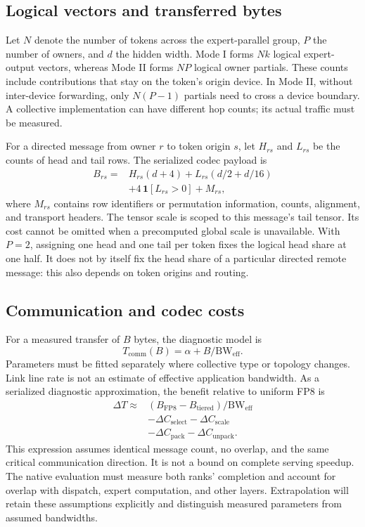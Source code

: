 \subsection{Logical vectors and transferred bytes}
Let $N$ denote the number of tokens across the expert-parallel group, $P$ the number of owners, and $d$ the hidden width. Mode I forms $Nk$ logical expert-output vectors, whereas Mode II forms $NP$ logical owner partials. These counts include contributions that stay on the token's origin device. In Mode II, without inter-device forwarding, only $N(P-1)$ partials need to cross a device boundary. A collective implementation can have different hop counts; its actual traffic must be measured.

For a directed message from owner $r$ to token origin $s$, let $H_{rs}$ and $L_{rs}$ be the counts of head and tail rows. The serialized codec payload is
\begin{align}
 B_{rs} ={}& H_{rs}(d+4) + L_{rs}(d/2+d/16) \\
 &+4\,\mathbf{1}[L_{rs}>0]+M_{rs},
\end{align}
where $M_{rs}$ contains row identifiers or permutation information, counts, alignment, and transport headers. The tensor scale is scoped to this message's tail tensor. Its cost cannot be omitted when a precomputed global scale is unavailable. With $P=2$, assigning one head and one tail per token fixes the logical head share at one half. It does not by itself fix the head share of a particular directed remote message: this also depends on token origins and routing.

\subsection{Communication and codec costs}
For a measured transfer of $B$ bytes, the diagnostic model is
\[
 T_{\mathrm{comm}}(B)=\alpha+B/\mathrm{BW}_{\mathrm{eff}}.
\]
Parameters must be fitted separately where collective type or topology changes. Link line rate is not an estimate of effective application bandwidth. As a serialized diagnostic approximation, the benefit relative to uniform FP8 is
\begin{align}
\Delta T \approx{}& (B_{\mathrm{FP8}}-B_{\mathrm{tiered}})/\mathrm{BW}_{\mathrm{eff}} \\
&-\Delta C_{\mathrm{select}}-\Delta C_{\mathrm{scale}} \\
&-\Delta C_{\mathrm{pack}}-\Delta C_{\mathrm{unpack}}.
\end{align}
This expression assumes identical message count, no overlap, and the same critical communication direction. It is not a bound on complete serving speedup. The native evaluation must measure both ranks' completion and account for overlap with dispatch, expert computation, and other layers. Extrapolation will retain these assumptions explicitly and distinguish measured parameters from assumed bandwidths.

